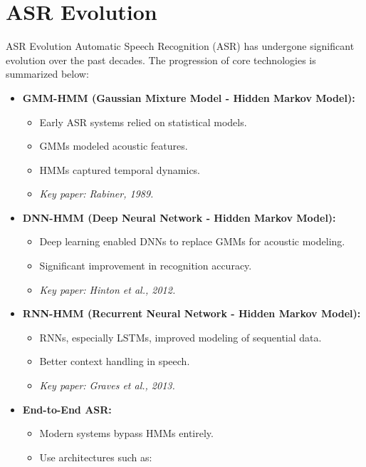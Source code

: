 \section{ASR Evolution}

\begin{frame}[allowframebreaks]{ASR Evolution}
Automatic Speech Recognition (ASR) has undergone significant evolution over the past decades. The progression of core technologies is summarized below:

\begin{itemize}
    \item \textbf{GMM-HMM (Gaussian Mixture Model - Hidden Markov Model):}
        \begin{itemize}
            \item Early ASR systems relied on statistical models.
            \item GMMs modeled acoustic features.
            \item HMMs captured temporal dynamics.
            \item \textit{Key paper: Rabiner, 1989.}
        \end{itemize}
    \item \textbf{DNN-HMM (Deep Neural Network - Hidden Markov Model):}
        \begin{itemize}
            \item Deep learning enabled DNNs to replace GMMs for acoustic modeling.
            \item Significant improvement in recognition accuracy.
            \item \textit{Key paper: Hinton et al., 2012.}
        \end{itemize}
    \item \textbf{RNN-HMM (Recurrent Neural Network - Hidden Markov Model):}
        \begin{itemize}
            \item RNNs, especially LSTMs, improved modeling of sequential data.
            \item Better context handling in speech.
            \item \textit{Key paper: Graves et al., 2013.}
        \end{itemize}
    \item \textbf{End-to-End ASR:}
        \begin{itemize}
            \item Modern systems bypass HMMs entirely.
            \item Use architectures such as:

\end{itemize}
\end{itemize}
\end{frame}
